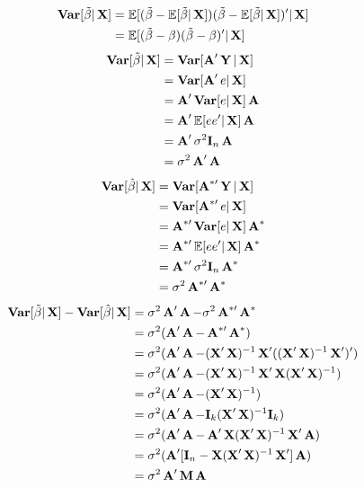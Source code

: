 \documentclass[UTF8,a4paper,10pt]{article}
\begin{document}
\begin{solution}
    \begin{equation}
      \begin{aligned}
        \Var[\tilde{\beta}|\X]&=\E[(\tilde{\beta}-\E[\tilde{\beta}|\X])(\tilde{\beta}-\E[\tilde{\beta}|\X])'|\X]\\
        &=\E[(\tilde{\beta}-\beta)(\tilde{\beta}-\beta)'|\X]\\
      \end{aligned}
    \end{equation}
    \begin{equation}
      \begin{aligned}
        \Var[\tilde{\beta}|\X]&=\Var[\A^{\prime}\Y|\X]\\
        &=\Var[\A^{\prime}e|\X]\\
        &=\A^{\prime}\Var[e|\X]\A\\
        &=\A^{\prime}\E[ee'|\X]\A\\
        &=\A^{\prime}\sigma^2\mathbf{I}_n\A\\
        &=\sigma^2\A^{\prime}\A
      \end{aligned}
    \end{equation}
    \begin{equation}
      \begin{aligned}
        \Var[\hat{\beta}|\X]&=\Var[\A^{*\prime}\Y|\X]\\
        &=\Var[\A^{*\prime}e|\X]\\
        &=\A^{*\prime}\Var[e|\X]\A^*\\
        &=\A^{*\prime}\E[ee'|\X]\A^*\\
        &=\A^{*\prime}\sigma^2\mathbf{I}_n\A^*\\
        &=\sigma^2\A^{*\prime}\A^*
      \end{aligned}
    \end{equation}
    \begin{equation}
      \begin{aligned}
        \Var[\tilde{\beta}|\X]-\Var[\hat{\beta}|\X]&=\sigma^2\A^{\prime}\A-\sigma^2\A^{*\prime}\A^*\\
        &=\sigma^2(\A^{\prime}\A-\A^{*\prime}\A^*)\\
        &=\sigma^2(\A^{\prime}\A-(\X'\X)^{-1}\X'((\X'\X)^{-1}\X')')\\
        &=\sigma^2(\A^{\prime}\A-(\X'\X)^{-1}\X'\X(\X'\X)^{-1})\\
        &=\sigma^2(\A^{\prime}\A-(\X'\X)^{-1})\\
        &=\sigma^2(\A'\A-\mathbf{I}_k(\X'\X)^{-1}\mathbf{I}_k)\\
        &=\sigma^2(\A'\A-\A'\X(\X'\X)^{-1}\X'\A)\\
        &=\sigma^2(\A'[\mathbf{I}_n-\X(\X'\X)^{-1}\X']\A)\\
        &=\sigma^2\A'\M\A
      \end{aligned}
    \end{equation}



    \end{solution}
    
\end{document}
